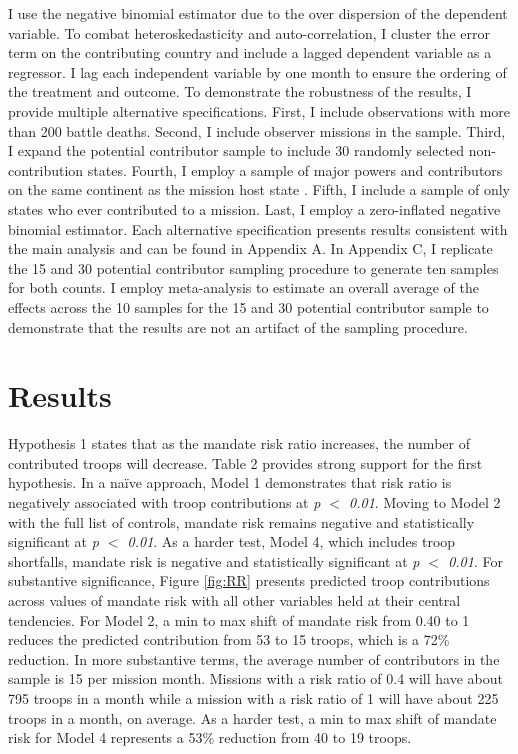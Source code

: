 \documentclass[12pt]{article}
\begin{document}
I use the negative binomial estimator due to the over dispersion of the dependent variable. To combat heteroskedasticity and auto-correlation, I cluster the error term on the contributing country and include a lagged dependent variable as a regressor. I lag each independent variable by one month to ensure the ordering of the treatment and outcome. To demonstrate the robustness of the results, I provide multiple alternative specifications. First, I include observations with more than 200 battle deaths. Second, I include observer missions in the sample. Third, I expand the potential contributor sample to include 30 randomly selected non-contribution states. Fourth, I employ a sample of major powers and contributors on the same continent as the mission host state \citep{Crescenzi2011}. Fifth, I include a sample of only states who ever contributed to a mission. Last, I employ a zero-inflated negative binomial estimator. Each alternative specification presents results consistent with the main analysis and can be found in Appendix A. In Appendix C, I replicate the 15 and 30 potential contributor sampling procedure to generate ten samples for both counts. I employ meta-analysis to estimate an overall average of the effects across the 10 samples for the 15 and 30 potential contributor sample to demonstrate that the results are not an artifact of the sampling procedure. 

\section*{Results}



Hypothesis 1 states that as the mandate risk ratio increases, the number of contributed troops will decrease. Table 2 provides strong support for the first hypothesis. In a naïve approach, Model 1 demonstrates that risk ratio is negatively associated with troop contributions at \textit{p $<$ 0.01}. Moving to Model 2 with the full list of controls, mandate risk remains negative and statistically significant at \textit{p $<$ 0.01}. As a harder test, Model 4, which includes troop shortfalls, mandate risk is negative and statistically significant at \textit{p $<$ 0.01}. For substantive significance, Figure \ref{fig:RR} presents predicted troop contributions across values of mandate risk with all other variables held at their central tendencies. For Model 2, a min to max shift of mandate risk from 0.40 to 1 reduces the predicted contribution from 53 to 15 troops, which is a 72\% reduction. In more substantive terms, the average number of contributors in the sample is 15 per mission month. Missions with a risk ratio of 0.4 will have about 795 troops in a month while a mission with a risk ratio of 1 will have about 225 troops in a month, on average. As a harder test, a min to max shift of mandate risk for Model 4 represents a 53\% reduction from 40 to 19 troops. 
\end{document}
